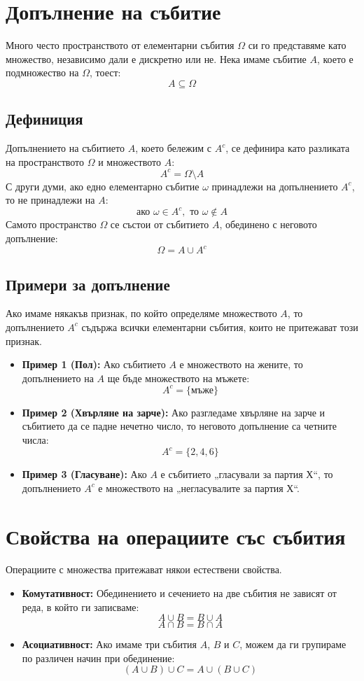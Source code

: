 \documentclass{article}
\begin{document}
\section{Допълнение на събитие}

Много често пространството от елементарни събития $\Omega$ си го представяме като множество, независимо дали е дискретно или не. Нека имаме събитие $A$, което е подмножество на $\Omega$, тоест:
\[
A \subseteq \Omega
\]

\subsection{Дефиниция}
Допълнението на събитието $A$, което бележим с $A^c$, се дефинира като разликата на пространството $\Omega$ и множеството $A$:
\[
A^c = \Omega \setminus A
\]
С други думи, ако едно елементарно събитие $\omega$ принадлежи на допълнението $A^c$, то не принадлежи на $A$:
\[
\text{ако } \omega \in A^c, \text{ то } \omega \notin A
\]
Самото пространство $\Omega$ се състои от събитието $A$, обединено с неговото допълнение:
\[
\Omega = A \cup A^c
\]

\subsection{Примери за допълнение}
Ако имаме някакъв признак, по който определяме множеството $A$, то допълнението $A^c$ съдържа всички елементарни събития, които не притежават този признак.
\begin{itemize}
    \item \textbf{Пример 1 (Пол):} Ако събитието $A$ е множеството на жените, то допълнението на $A$ ще бъде множеството на мъжете:
    \[
    A^c = \{\text{мъже}\}
    \]
    \item \textbf{Пример 2 (Хвърляне на зарче):} Ако разгледаме хвърляне на зарче и събитието да се падне нечетно число, то неговото допълнение са четните числа:
    \[
    A^c = \{2, 4, 6\}
    \]
    \item \textbf{Пример 3 (Гласуване):} Ако $A$ е събитието „гласували за партия Х“, то допълнението $A^c$ е множеството на „негласувалите за партия Х“.
\end{itemize}

\section{Свойства на операциите със събития}

Операциите с множества притежават някои естествени свойства.
\begin{itemize}
    \item \textbf{Комутативност:} Обединението и сечението на две събития не зависят от реда, в който ги записваме:
    \[
    A \cup B = B \cup A
    \]
    \[
    A \cap B = B \cap A
    \]
    \item \textbf{Асоциативност:} Ако имаме три събития $A$, $B$ и $C$, можем да ги групираме по различен начин при обединение:
    \[
    (A \cup B) \cup C = A \cup (B \cup C)
    \]
\end{itemize}
\end{document}
